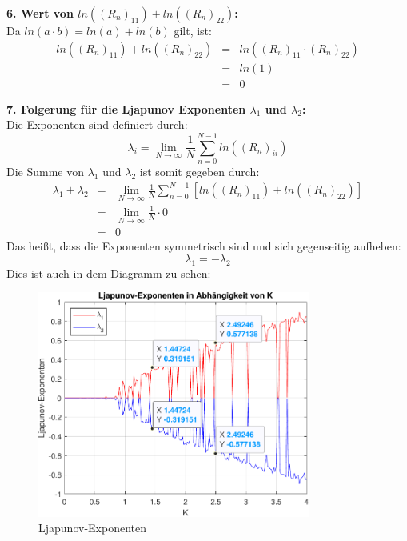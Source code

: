 \documentclass[paper=a4, 
                DIV=12]{scrartcl}
\begin{document}
\noindent\textbf{6. Wert von $ln((R_n)_{11}) + ln((R_n)_{22})$:} \\
Da $ln(a \cdot b) = ln(a) + ln(b)$ gilt, ist:
\begin{eqnarray*}
    ln((R_n)_{11}) + ln((R_n)_{22}) &=& ln((R_n)_{11} \cdot (R_n)_{22}) \\
    &=& ln(1) \\
    &=& 0
\end{eqnarray*}

\newpage
\noindent\textbf{7. Folgerung für die Ljapunov Exponenten $\lambda_1$ und $\lambda_2$:} \\
Die Exponenten sind definiert durch: 
$$ \lambda_i = \lim_{N\to\infty}\frac{1}{N}\sum_{n=0}^{N-1}ln((R_n)_{ii}) $$
Die Summe von $\lambda_1$ und $\lambda_2$ ist somit gegeben durch:
\begin{eqnarray*}
    \lambda_1 + \lambda_2 &=& \lim_{N\to\infty}\frac{1}{N}\sum_{n=0}^{N-1}[ln((R_n)_{11}) + ln((R_n)_{22})] \\
    &=& \lim_{N\to\infty}\frac{1}{N}\cdot 0 \\
    &=& 0
\end{eqnarray*}
Das heißt, dass die Exponenten symmetrisch sind und sich gegenseitig aufheben:
$$ \lambda_1 = -\lambda_2 $$
Dies ist auch in dem Diagramm zu sehen:
\begin{figure}[H]
    \centering
    \includegraphics[width=0.8\textwidth]{figures/exponenten_data.pdf}
    \caption{Ljapunov-Exponenten}
\end{figure}
\end{document}
